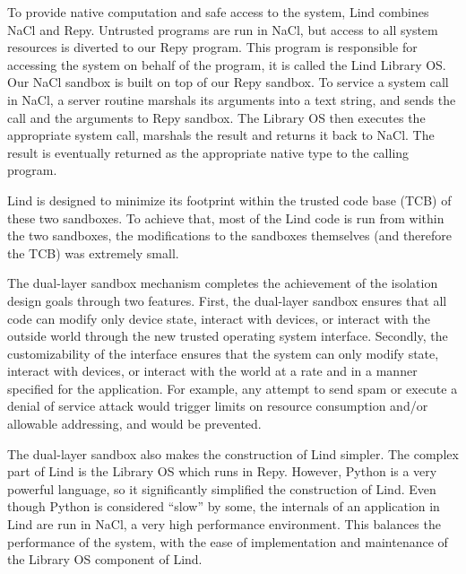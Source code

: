 

\par
To provide native computation and safe access to the system, Lind combines NaCl and Repy. Untrusted programs are run in NaCl, but access to all system resources is diverted to our Repy program. This program is responsible for accessing the system on behalf of the program, it is called the Lind Library OS. Our NaCl sandbox is built on top of our Repy sandbox. To service a system call in NaCl, a server routine marshals its arguments into a text string, and sends the call and the arguments to Repy sandbox. The Library OS then executes the appropriate system call, marshals the result and returns it back to NaCl. The result is eventually returned as the appropriate native type to the calling program. 


\par
Lind is designed to minimize its footprint within the trusted code base (TCB) of these two sandboxes. To achieve that, most of the Lind code is run from within the two sandboxes, the modifications to the sandboxes themselves (and therefore the TCB) was extremely small. 


\par
The dual-layer sandbox mechanism completes the achievement of the isolation design goals through two features. First, the dual-layer sandbox ensures that all code can modify only device state, interact with devices, or interact with the outside world through the new trusted operating system interface. Secondly, the customizability of the interface ensures that the system can only modify state, interact with devices, or interact with the world at a rate and in a manner specified for the application. For example, any attempt to send spam or execute a denial of service attack would trigger limits on resource consumption and/or allowable addressing, and would be prevented. 


\par
The dual-layer sandbox also makes the construction of Lind simpler. The complex part of Lind is the Library OS which runs in Repy. However, Python is a very powerful language, so it significantly simplified the construction of Lind. Even though Python is considered ``slow'' by some, the internals of an application in Lind are run in NaCl, a very high performance environment. This balances the performance of the system, with the ease of implementation and maintenance of the Library OS component of Lind. 


